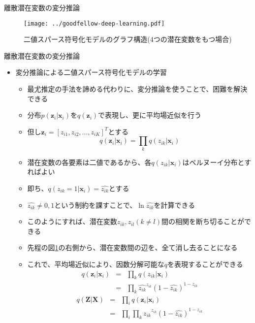 \documentclass[dvipdfmx,notheorems,t]{beamer}
\begin{document}
\begin{frame}{離散潜在変数の変分推論}

\begin{figure}[h]
	\centering
	\texttt{[image: ../goodfellow-deep-learning.pdf]}
	\caption{二値スパース符号化モデルのグラフ構造(4つの潜在変数をもつ場合)}
	\label{fig:graph-structure-of-binary-sparse-coding-model}
\end{figure}

\end{frame}

\begin{frame}{離散潜在変数の変分推論}

\begin{itemize}
	\item 変分推論による二値スパース符号化モデルの学習
	\begin{itemize}
		\item 最尤推定の手法を諦める代わりに、変分推論を使うことで、困難を解決できる
		\item 分布$p(\bm{z}_i | \bm{x}_i)$を$q(\bm{z}_i)$で表現し、更に平均場近似を行う
		\item 但し$\bm{z}_i = \left[ z_{i1}, z_{i2}, \ldots, z_{iK} \right]^T$とする
		\begin{equation}
			q(\bm{z}_i | \bm{x}_i) = \prod_k q(z_{ik} | \bm{x}_i)
		\end{equation}
		
		\item 潜在変数の各要素は二値であるから、各$q(z_{ik} | \bm{x}_i)$は\alert{ベルヌーイ分布}とすればよい
		\item 即ち、\color{red}$q(z_{ik} = 1 | \bm{x}_i) = \widehat{z_{ik}}$\normalcolor とする
		\item $\widehat{z_{ik}} \neq 0, 1$という制約を課すことで、$\ln \widehat{z_{ik}}$を計算できる
		\newline
		\item このようにすれば、潜在変数$z_{ik}, z_{il} (k \neq l)$間の\alert{相関を断ち切る}ことができる
		\item 先程の図\ref{fig:graph-structure-of-binary-sparse-coding-model}の右側から、潜在変数間の辺を、全て消し去ることになる
		
		\item これで、平均場近似により、因数分解可能な$q$を表現することができる
		\begin{eqnarray}
			q(\bm{z}_i | \bm{x}_i) &=& \prod_k q(z_{ik} | \bm{x}_i) \\
			&=& \prod_k \widehat{z_{ik}}^{z_{ik}} \left( 1 - \widehat{z_{ik}} \right)^{1 - z_{ik}}
		\end{eqnarray}
		\begin{eqnarray}
			q(\bm{Z} | \bm{X}) &=& \prod_i q(\bm{z}_i | \bm{x}_i) \\
			&=& \prod_i \prod_k \widehat{z_{ik}}^{z_{ik}} \left( 1 - \widehat{z_{ik}} \right)^{1 - z_{ik}}
		\end{eqnarray}
		

\end{itemize}
\end{itemize}
\end{frame}
\end{document}
